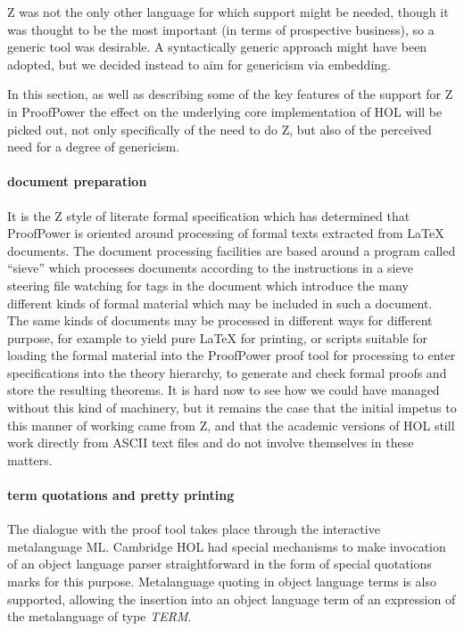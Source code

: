 \documentclass[10pt,titlepage]{book}
\def\Product{ProofPower}
\begin{document}
Z was not the only other language for which support might be needed, though it was thought to be the most important (in terms of prospective business), so a generic tool was desirable.
A syntactically generic approach might have been adopted, but we decided instead to aim for genericism via embedding.

In this section, as well as describing some of the key features of the support for Z in {\Product} the effect on the underlying core implementation of HOL will be picked out, not only specifically of the need to do Z, but also of the perceived need for a degree of genericism.

\paragraph{document preparation}

It is the Z style of literate formal specification which has determined that {\Product} is oriented around processing of formal texts extracted from {\LaTeX} documents.
The document processing facilities are based around a program called ``sieve'' which processes documents according to the instructions in a sieve steering file watching for tags in the document which introduce the many different kinds of formal material which may be included in such a document.
The same kinds of documents may be processed in different ways for different purpose, for example to yield pure {\LaTeX} for printing, or scripts suitable for loading the formal material into the {\Product} proof tool  for processing to enter specifications into the theory hierarchy, to generate and check formal proofs and store the resulting theorems.
It is hard now to see how we could have managed without this kind of machinery, but it remains the case that the initial impetus to this manner of working came from Z, and that the academic versions of HOL still work directly from ASCII text files and do not involve themselves in these matters.

\paragraph{term quotations and pretty printing}

The dialogue with the proof tool takes place through the interactive metalanguage ML.
Cambridge HOL had special mechanisms to make invocation of an object language parser straightforward in the form of special quotations marks for this purpose.
Metalanguage quoting in object language terms is also supported, allowing the insertion into an object language term of an expression of the metalanguage of type {\it TERM}.
\end{document}
